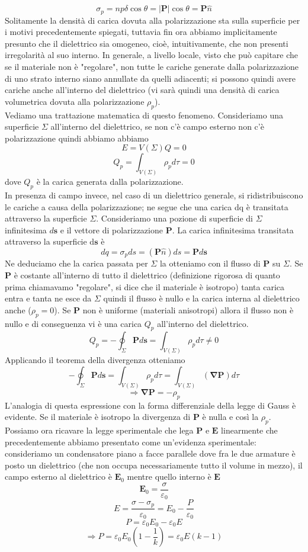 \documentclass[10pt,a4paper]{article}
\begin{document}
\[\sigma_p = np\delta \cos\theta= |\mathbf{P}|\cos\theta = \mathbf{P}\hat{n}\]
Solitamente la densità di carica dovuta alla polarizzazione sta sulla superficie per i motivi precedentemente spiegati, tuttavia fin ora abbiamo implicitamente presunto che il dielettrico sia omogeneo, cioè, intuitivamente, che non presenti irregolarità al suo interno.
In generale, a livello locale, visto che può capitare che se il materiale non è "regolare", non tutte le cariche generate dalla polarizzazione di uno strato interno siano annullate da quelli adiacenti; si possono quindi avere cariche anche all'interno del dielettrico (vi sarà quindi una densità di carica volumetrica dovuta alla polarizzazione \(\rho_p\)).\\
Vediamo una trattazione matematica di questo fenomeno. Consideriamo una superficie $\Sigma$ all'interno del dielettrico, se non c'è campo esterno non c'è polarizzazione quindi abbiamo abbiamo
\[E = V(\Sigma) Q = 0\]
\[Q_p = \int_{V(\Sigma)}\rho_p d\tau = 0\]
dove \(Q_p\) è la carica generata dalla polarizzazione.\\
In presenza di campo invece, nel caso di un dielettrico generale, si ridistribuiscono le cariche a causa della polarizzazione; ne segue che una carica dq è transitata attraverso la superficie $\Sigma$. Consideriamo una pozione di superficie di \(\Sigma\) infinitesima $d\mathbf{s}$ e il vettore di polarizzazione $\mathbf{P}$. La carica infinitesima transitata attraverso la superficie d$\mathbf{s}$ è
\[dq = \sigma_pds=(\mathbf{P}\hat{n})ds = \mathbf{P}d\mathbf{s}\]
Ne deduciamo che la carica passata per \(\Sigma\) la otteniamo con il flusso di $\mathbf{P}$ su $\Sigma$. Se $\mathbf{P}$ è costante all'interno di tutto il dielettrico (definizione rigorosa di quanto prima chiamavamo "regolare", si dice che il materiale è isotropo) tanta carica entra e tanta ne esce da $\Sigma$ quindi il flusso è nullo e la carica interna al dielettrico anche (\(\rho_p = 0\)). Se $\mathbf{P}$ non è uniforme (materiali anisotropi) allora il flusso non è nullo e di conseguenza vi è una carica $Q_p$ all'interno del dielettrico. 
\[ Q_p = -\oint_{\Sigma} \mathbf{P}d\mathbf{s} = \int_{V(\Sigma)}\rho_p d\tau \neq 0 \]
Applicando il teorema della divergenza otteniamo
\[-\oint_{\Sigma} \mathbf{P}d\mathbf{s} = \int_{V(\Sigma)}\rho_p d\tau = \int_{V(\Sigma)}(\mathbf{\nabla}\mathbf{P})d\tau \]
\[\Rightarrow \mathbf{\nabla}\mathbf{P} = -\rho_p\]
L'analogia di questa espressione con la forma differenziale della legge di Gauss è evidente. Se il materiale è isotropo la divergenza di $\mathbf{P}$ è nulla e così la \(\rho_p\).\\
Possiamo ora ricavare la legge sperimentale che lega $\mathbf{P}$ e $\mathbf{E}$ linearmente che precedentemente abbiamo presentato come un'evidenza sperimentale: consideriamo un condensatore piano a facce parallele dove fra le due armature è posto un dielettrico (che non occupa necessariamente tutto il volume in mezzo), il campo esterno al dielettrico è $\mathbf{E}_0$ mentre quello interno è $\mathbf{E}$
\[\mathbf{E}_0 = \frac{\sigma}{\varepsilon_0}\]
\[E = \frac{\sigma - \sigma_p}{\varepsilon_0} = E_0 -\frac{P}{\varepsilon_0}\]
\[P = \varepsilon_0 E_0- \varepsilon_0 E\]
\[\Rightarrow P = \varepsilon_0 E_0 (1-\frac{1}{k}) = \varepsilon_0 E(k-1) \]
\end{document}

